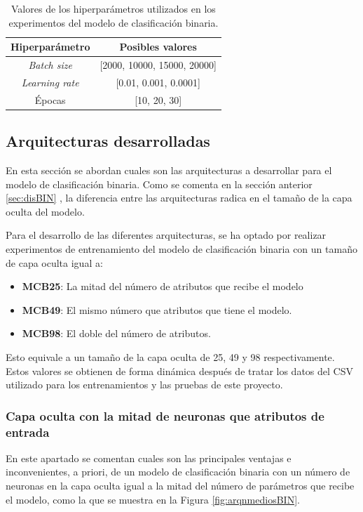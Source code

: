 \begin{table}[H]
\centering
\begin{tabular}{|c|c|}
\hline
\textbf{Hiperparámetro} & \textbf{Posibles valores} \\ \hline
\textit{Batch size} & [2000, 10000, 15000, 20000] \\ \hline
\textit{Learning rate} & [0.01, 0.001, 0.0001] \\ \hline
Épocas & [10, 20, 30] \\ \hline
\end{tabular}
\caption{Valores de los hiperparámetros utilizados en los experimentos del modelo de clasificación binaria.}
\label{tab:hiperBIN}
\end{table}

\subsection{Arquitecturas desarrolladas}
En esta sección se abordan cuales son las arquitecturas a desarrollar para el modelo de clasificación binaria. Como se comenta en la sección anterior \ref{sec:disBIN} , la diferencia entre las arquitecturas radica en el tamaño de la capa oculta del modelo.

Para el desarrollo de las diferentes arquitecturas, se ha optado por realizar experimentos de entrenamiento del modelo de clasificación binaria con un tamaño de capa oculta igual a:
\begin{itemize}

	\item \textbf{MCB25}: La mitad del número de atributos que recibe el modelo
	\item \textbf{MCB49}: El mismo número que atributos que tiene el modelo.
	\item \textbf{MCB98}: El doble del número de atributos. 

\end{itemize}

Esto equivale a un tamaño de la capa oculta de 25, 49 y 98 respectivamente. Estos valores se obtienen de forma dinámica después de tratar los datos del CSV utilizado para los entrenamientos y las pruebas de este proyecto.



\subsubsection{Capa oculta con la mitad de neuronas que atributos de entrada}\label{sec:VIBIN25}
En este apartado se comentan cuales son las principales ventajas e inconvenientes, a priori, de un modelo de clasificación binaria con un número de neuronas en la capa oculta igual a la mitad del número de parámetros que recibe el modelo, como la que se muestra en la Figura \ref{fig:arqnmediosBIN}.

